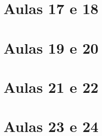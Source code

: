 \begin{apendicesenv}
\chapter{Aulas 17 e 18} \label{ApendiceJ} 
\chapter{Aulas 19 e 20} \label{ApendiceK} 
\chapter{Aulas 21 e 22} \label{ApendiceL} 
\chapter{Aulas 23 e 24} \label{ApendiceM} 
    
\end{apendicesenv}
